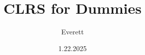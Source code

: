 \documentclass[a4paper,14pt,twoside]{extbook}
\title{CLRS for Dummies}
\author{Everett}
\date{1.22.2025}
\begin{document}
\onehalfspacing
\maketitle
\tableofcontents
\frontmatter%


\mainmatter%


\backmatter%


\printindex
\end{document}

